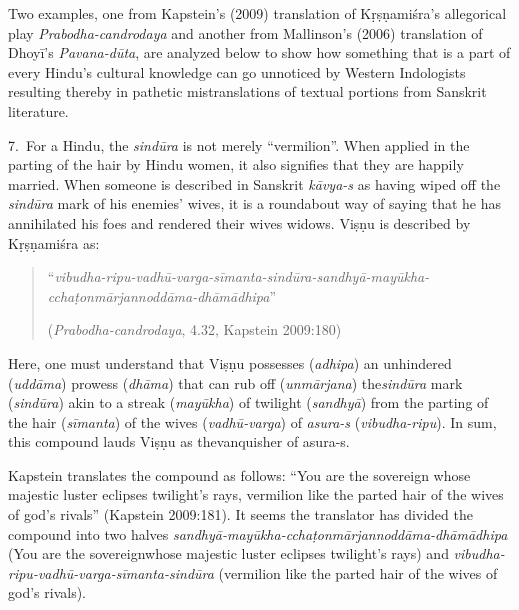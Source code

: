 Two examples, one from Kapstein’s (2009) translation of Kṛṣṇamiśra’s allegorical play \textsl{Prabodha-candrodaya} and another from Mallinson’s (2006) translation of Dhoyī’s \textsl{Pavana-dūta}, are analyzed below to show how something that is a part of every Hindu’s cultural knowledge can go unnoticed by Western Indologists resulting thereby in pathetic mistranslations of textual portions from Sanskrit literature. 

7.~For a Hindu, the \textsl{sindūra} is not merely “vermilion”. When applied in the parting of the hair by Hindu women, it also signifies that they are happily married. When someone is described in Sanskrit \textsl{kāvya-s} as having wiped off the \textsl{sindūra} mark of his enemies’ wives, it is a roundabout way of saying that he has annihilated his foes and rendered their wives widows. Viṣṇu is described by Kṛṣṇamiśra as: 
\begin{quote}
“\textsl{vibudha-ripu-vadhū-varga-sīmanta-sindūra-sandhyā-mayūkha-cchaṭonmārjannoddāma-dhāmādhipa}” 

\hfill(\textsl{Prabodha-candrodaya}, 4.32, Kapstein 2009:180)
\end{quote}

Here, one must understand that Viṣṇu possesses (\textsl{adhipa}) an unhindered (\textsl{uddāma}) prowess (\textsl{dhāma}) that can rub off (\textsl{unmārjana}) the\break \textsl{sindūra} mark (\textsl{sindūra}) akin to a streak (\textsl{mayūkha}) of twilight (\textsl{sandhyā}) from the parting of the hair (\textsl{sīmanta}) of the wives (\textsl{vadhū-varga}) of \textsl{asura-s} (\textsl{vibudha-ripu}). In sum, this compound lauds Viṣṇu as the\break vanquisher of asura-s. 

Kapstein translates the compound as follows: “You are the sovereign whose majestic luster eclipses twilight’s rays, vermilion like the parted hair of the wives of god’s rivals” (Kapstein 2009:181). It seems the translator has divided the compound into two halves \textsl{sandhyā-mayūkha-cchaṭonmārjannoddāma-dhāmādhipa} (You are the sovereign\break whose majestic luster eclipses twilight’s rays) and \textsl{vibudha-ripu-vadhū-varga-sīmanta-sindūra} (vermilion like the parted hair of the wives of god’s rivals). 

